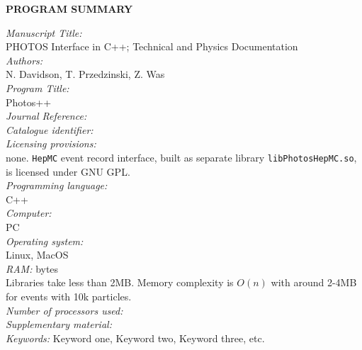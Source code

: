 {\bf PROGRAM SUMMARY}

\begin{small}
\noindent
{\em Manuscript Title:}                                       \\
PHOTOS Interface in C++; Technical and Physics Documentation \\
{\em Authors:}                                                \\
N. Davidson, T. Przedzinski, Z. Was \\
{\em Program Title:}                                          \\
Photos++ \\
{\em Journal Reference:}                                      \\
{\em Catalogue identifier:}                                   \\
{\em Licensing provisions:}                                   \\
none. {\tt HepMC} event record interface, built as separate
library {\tt libPhotosHepMC.so}, is licensed under GNU GPL.   \\
{\em Programming language:}                                   \\
C++ \\
{\em Computer:}                                               \\
PC \\
{\em Operating system:}                                       \\
Linux, MacOS \\
{\em RAM:} bytes                                              \\
Libraries take less than 2MB. Memory complexity is $O(n)$ with around 2-4MB for
events with 10k particles. \\
{\em Number of processors used:}                              \\
{\em Supplementary material:}                                 \\
{\em Keywords:} Keyword one, Keyword two, Keyword three, etc.  \\

\end{small}
